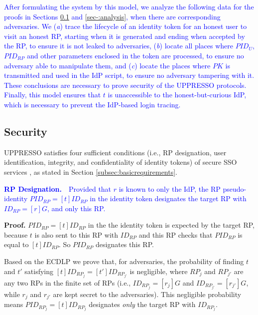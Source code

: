 \textcolor{blue}{After formulating the system by this model,
    we analyze the following data for the proofs in Sections \ref{analysis-security} and \ref{sec-:analysis},
     when there are corresponding adversaries.
We (\emph{a}) trace the lifecycle of an identity token for an honest user to visit an honest RP,
        starting when it is generated and ending when accepted by the RP,
    to ensure it is not leaked to adversaries,
(\emph{b})
    locate all places
        where $PID_U$, $PID_{RP}$ and other parameters enclosed in the token are processed,
     to ensure no adversary able to manipulate them,
and (\emph{c})
    locate the places where $PK$ is transmitted and used in the IdP script,
        to ensure no adversary tampering with it.
These conclusions are necessary to prove security of the UPPRESSO protocols.
%
Finally,
        this model ensures that $t$ is unaccessible to the honest-but-curious IdP,
 which is necessary to prevent the IdP-based login tracing.}


\subsection{Security}
\label{analysis-security}
UPPRESSO satisfies four sufficient conditions
    (i.e., RP designation, user identification, integrity, and confidentiality of identity tokens) 
        of secure SSO services \cite{ArmandoCCCT08,FettKS16, FettKS17},
     as stated in Section \ref{subsec:basicrequirements}.


\vspace{1mm}
\noindent\textcolor{blue}{\textbf{RP Designation.}~~Provided that $r$ is known to only the IdP,
the RP pseudo-identity $PID_{RP} = [t]ID_{RP}$ in the identity token
     designates the target RP with $ID_{RP} = [r]G$, and only this RP.}

\vspace{0.75mm}
\noindent\textbf{Proof.}
$PID_{RP} = [t]ID_{RP}$ in the the identity token is expected by the target RP,
    because $t$ is also sent to this RP with $ID_{RP}$
     and this RP checks that $PID_{RP}$ is equal to $[t]ID_{RP}$.
So $PID_{RP}$ designates this RP.


Based on the ECDLP
    we prove that,
    for adversaries,
        the probability of finding $t$ and $t'$
    satisfying $[t]ID_{RP_j} = [t']ID_{RP_{j'}}$ is negligible,
    where $RP_j$ and $RP_{j'}$ are any two RPs in the finite set of RPs (i.e.,
    $ID_{RP_j} = [r_j]G$ and $ID_{RP_{j'}} = [r_{j'}]G$, while $r_j$ and $r_{j'}$ are kept secret to the adversaries).
This negligible probability means $PID_{RP_j} = [t]ID_{RP_j}$ designates \emph{only} the target RP with $ID_{RP_j}$.

